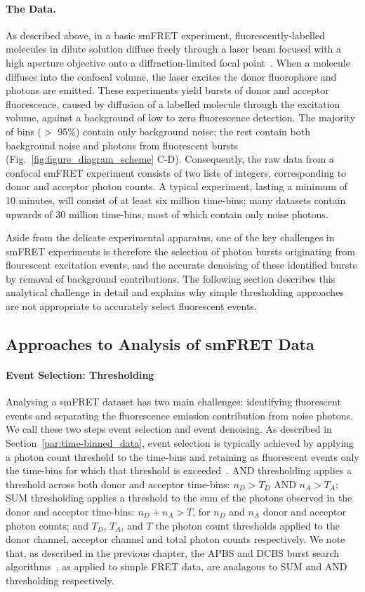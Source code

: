 \paragraph{The Data.}
As described above, in a basic smFRET experiment, fluorescently-labelled molecules in dilute solution diffuse freely through a laser beam focused with a high aperture objective onto a diffraction-limited focal point~\cite{schuler05}.  When a molecule diffuses into the confocal volume, the laser excites the donor fluorophore and photons are emitted. These experiments yield bursts of donor and acceptor fluorescence, caused by diffusion of a labelled molecule through the excitation volume, against a background of low to zero fluorescence detection. The majority of bins ($>$ 95\%) contain only background noise; the rest contain both background noise and photons from fluorescent bursts (Fig.~\ref{fig:figure_diagram_scheme} C-D). Consequently, the raw data from a confocal smFRET experiment consists of two lists of integers, corresponding to donor and acceptor photon counts. A typical experiment, lasting a minimum of 10 minutes, will consist of at least six million time-bins; many datasets contain upwards of 30 million time-bins, most of which contain only noise photons. 

Aside from the delicate experimental apparatus, one of the key challenges in smFRET experiments is therefore the selection of photon bursts originating from flourescent excitation events, and the accurate denoising of these identified bursts by removal of background contributions. The following section describes this analytical challenge in detail and explains why simple thresholding approaches are not appropriate to accurately select fluorescent events.

\subsection{Approaches to Analysis of smFRET Data}
\paragraph{Event Selection: Thresholding}
Analysing a smFRET dataset has two main challenges: identifying fluorescent events and separating the fluorescence emission contribution from noise photons. We call these two steps event selection and event denoising. As described in Section~\ref{par:time-binned_data}, event selection is typically achieved by applying a photon count threshold to the time-bins and retaining as fluorescent events only the time-bins for which that threshold is exceeded~\cite{deniz01, gell06, ying00}. AND thresholding applies a threshold across both donor and acceptor time-bins: $n_D > T_D$ AND $n_A > T_A$; SUM thresholding applies a threshold to the sum of the photons observed in the donor and acceptor time-bins: $n_D  + n_A > T$, for $n_D$ and  $n_A$ donor and acceptor photon counts; and $T_D$, $T_A$, and $T$ the photon count thresholds applied to the donor channel, acceptor channel and total photon counts respectively. We note that, as described in the previous chapter, the APBS and DCBS burst search algorithms~\cite{nir06}, as applied to simple FRET data, are analagous to SUM and AND thresholding respectively.

